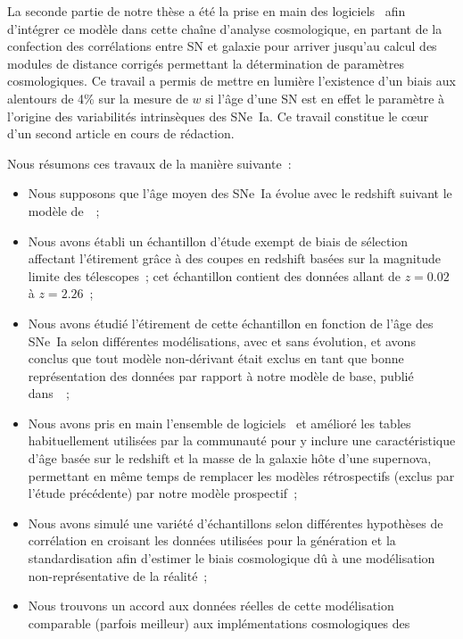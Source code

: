 \documentclass[../main/main.tex]{subfiles}
\begin{document}
La seconde partie de notre thèse a été la prise en main des logiciels \snana\
afin d'intégrer ce modèle dans cette chaîne d'analyse cosmologique, en partant
de la confection des corrélations entre SN et galaxie pour arriver jusqu'au
calcul des modules de distance corrigés permettant la détermination de
paramètres cosmologiques. Ce travail a permis de mettre en lumière l'existence
d'un biais aux alentours de 4\% sur la mesure de $w$ si l'âge d'une SN est en
effet le paramètre à l'origine des variabilités intrinsèques des SNe~Ia. Ce
travail constitue le cœur d'un second article en cours de rédaction.

Nous résumons ces travaux de la manière suivante~:
\begin{itemize}
    \item Nous supposons que l'âge moyen des SNe~Ia évolue avec le
        redshift suivant le modèle de~\cite{rigault2020}~;
    \item Nous avons établi un échantillon d'étude exempt de biais de sélection
        affectant l'étirement grâce à des coupes en redshift basées sur la
        magnitude limite des télescopes~; cet échantillon contient des données
        allant de $z = \num{0.02}$ à $z = \num{2.26}$~;
    \item Nous avons étudié l'étirement de cette échantillon en fonction de
        l'âge des SNe~Ia selon différentes modélisations, avec et sans
        évolution, et avons conclus que tout modèle non-dérivant était exclus en
        tant que bonne représentation des données par rapport à notre modèle de
        base, publié dans~\cite{nicolas2021}~;
    \item Nous avons pris en main l'ensemble de logiciels \snana\ et amélioré
        les tables habituellement utilisées par la communauté pour y inclure une
        caractéristique d'âge basée sur le redshift et la masse de la galaxie
        hôte d'une supernova, permettant en même temps de remplacer les modèles
        rétrospectifs (exclus par l'étude précédente) par notre modèle
        prospectif~;
    \item Nous avons simulé une variété d'échantillons selon différentes
        hypothèses de corrélation en croisant les données utilisées pour la
        génération et la standardisation afin d'estimer le biais cosmologique dû
        à une modélisation non-représentative de la réalité~;
    \item Nous trouvons un accord aux données réelles de cette modélisation
        comparable (parfois meilleur) aux implémentations cosmologiques des

\end{itemize}
\end{document}
